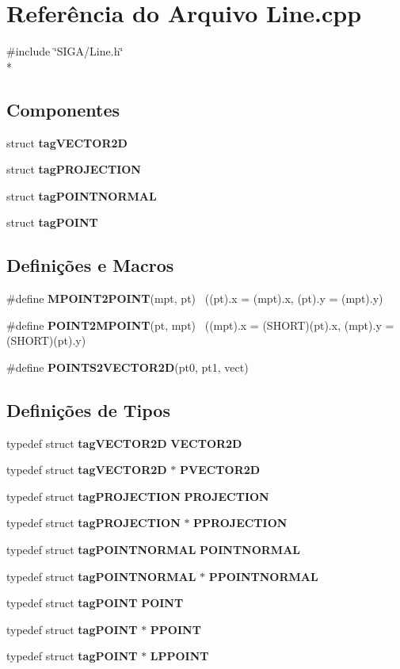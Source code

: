 \section{Referência do Arquivo Line.\+cpp}
\label{_line_8cpp}
{\ttfamily \#include \char`\"{}S\+I\+G\+A/\+Line.\+h\char`\"{}}\\*
\subsection*{Componentes}
\begin{DoxyCompactItemize}
\item 
struct {\bf tag\+V\+E\+C\+T\+O\+R2D}
\item 
struct {\bf tag\+P\+R\+O\+J\+E\+C\+T\+I\+ON}
\item 
struct {\bf tag\+P\+O\+I\+N\+T\+N\+O\+R\+M\+AL}
\item 
struct {\bf tag\+P\+O\+I\+NT}
\end{DoxyCompactItemize}
\subsection*{Definições e Macros}
\begin{DoxyCompactItemize}
\item 
\#define {\bf M\+P\+O\+I\+N\+T2\+P\+O\+I\+NT}(mpt,  pt)  ~((pt).x = (mpt).x, (pt).y = (mpt).y)
\item 
\#define {\bf P\+O\+I\+N\+T2\+M\+P\+O\+I\+NT}(pt,  mpt)  ~((mpt).x = (S\+H\+O\+RT)(pt).x, (mpt).y = (S\+H\+O\+RT)(pt).y)
\item 
\#define {\bf P\+O\+I\+N\+T\+S2\+V\+E\+C\+T\+O\+R2D}(pt0,  pt1,  vect)
\end{DoxyCompactItemize}
\subsection*{Definições de Tipos}
\begin{DoxyCompactItemize}
\item 
typedef struct {\bf tag\+V\+E\+C\+T\+O\+R2D} {\bf V\+E\+C\+T\+O\+R2D}
\item 
typedef struct {\bf tag\+V\+E\+C\+T\+O\+R2D} $\ast$ {\bf P\+V\+E\+C\+T\+O\+R2D}
\item 
typedef struct {\bf tag\+P\+R\+O\+J\+E\+C\+T\+I\+ON} {\bf P\+R\+O\+J\+E\+C\+T\+I\+ON}
\item 
typedef struct {\bf tag\+P\+R\+O\+J\+E\+C\+T\+I\+ON} $\ast$ {\bf P\+P\+R\+O\+J\+E\+C\+T\+I\+ON}
\item 
typedef struct {\bf tag\+P\+O\+I\+N\+T\+N\+O\+R\+M\+AL} {\bf P\+O\+I\+N\+T\+N\+O\+R\+M\+AL}
\item 
typedef struct {\bf tag\+P\+O\+I\+N\+T\+N\+O\+R\+M\+AL} $\ast$ {\bf P\+P\+O\+I\+N\+T\+N\+O\+R\+M\+AL}
\item 
typedef struct {\bf tag\+P\+O\+I\+NT} {\bf P\+O\+I\+NT}
\item 
typedef struct {\bf tag\+P\+O\+I\+NT} $\ast$ {\bf P\+P\+O\+I\+NT}
\item 
typedef struct {\bf tag\+P\+O\+I\+NT} $\ast$ {\bf L\+P\+P\+O\+I\+NT}
\end{DoxyCompactItemize}
